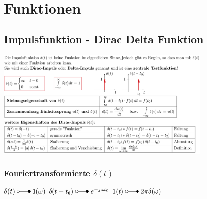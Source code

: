 \section{Funktionen}
	\subsection{Impulsfunktion - Dirac Delta Funktion}
		\includegraphics[width=0.8\textwidth]{./bilder/funktionen/impulsF.png}
	
	\subsubsection{Fouriertransformierte $\delta(t)$}
		$\delta(t) \; \laplace \; 1(\omega)$ \qquad
		$\delta(t-t_0) \; \laplace \; e^{-j\omega t_0}$ \qquad
		$1(t) \; \laplace \; 2\pi \delta(\omega)$



